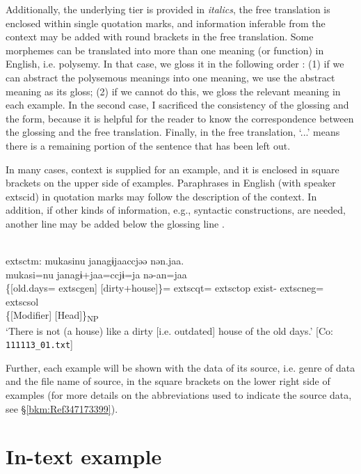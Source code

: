Additionally, the underlying tier is provided in \textit{italics}, the free translation is enclosed within single quotation marks, and information inferable from the context may be added with round brackets in the free translation. Some morphemes can be translated into more than one meaning (or function) in English, i.e. polysemy. In that case, we gloss it in the following order \citep[cf.][11--12]{Lehmann2004}: (1) if we can abstract the polysemous meanings into one meaning, we use the abstract meaning as its gloss; (2) if we cannot do this, we gloss the relevant meaning in each example. In the second case, I sacrificed the consistency of the glossing and the form, because it is helpful for the reader to know the correspondence between the glossing and the free translation. Finally, in the free translation, ‘...’ means there is a remaining portion of the sentence that has been left out.

In many cases, context is supplied for an example, and it is enclosed in square brackets on the upper side of examples. Paraphrases in English (with speaker 	extsc{id}) in quotation marks may follow the description of the context. In addition, if other kinds of information, e.g., syntactic constructions, are needed, another line may be added below the glossing line \citep[cf.][4--5]{Lehmann2004}.

\ea{}\\
	extsc{tm}: \gllll mukasinu janagɨjaaccjəə nən.jaa.\\
          mukasi=nu janagɨ+jaa=ccjɨ=ja nə-an=jaa\\
          \{[old.days=	extsc{gen}] [dirty+house]\}=	extsc{qt}=	extsc{top} exist-	extsc{neg}=	extsc{sol}\\
          \{[Modifier] [Head]\}\textsubscript{NP}\\
   \glt{} ‘There is not (a house) like a dirty [i.e. outdated] house of the old days.’ [Co: \texttt{111113\_01.txt}]

\z

Further, each example will be shown with the data of its source, i.e. genre of data and the file name of source, in the square brackets on the lower right side of examples (for more details on the abbreviations used to indicate the source data, see §\ref{bkm:Ref347173399}).

\section*{In-text example}

